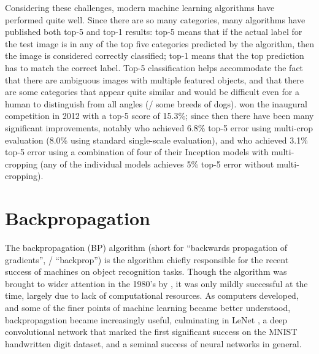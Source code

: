 Considering these challenges,
modern machine learning algorithms have performed quite well.
Since there are so many categories, many algorithms have published
both top-5 and top-1 results:
top-5 means that if the actual label for the test image
is in any of the top five categories predicted by the algorithm,
then the image is considered correctly classified;
top-1 means that the top prediction has to match the correct label.
Top-5 classification helps accommodate the fact that there are ambiguous images
with multiple featured objects,
and that there are some categories that appear quite similar
and would be difficult even for a human to distinguish from all angles
(\eg/ some breeds of dogs).
\textcite{Krizhevsky2012} won the inaugural competition in 2012
with a top-5 score of 15.3\%;
since then there have been many significant improvements,
notably \textcite{Simonyan2015} who achieved 6.8\% top-5 error
using multi-crop evaluation (8.0\% using standard single-scale evaluation),
and \textcite{Szegedy2016} who achieved 3.1\% top-5 error
using a combination of four of their Inception models with multi-cropping
(any of the individual models achieves 5\% top-5 error without multi-cropping).


\section{Backpropagation}

The backpropagation (BP) algorithm
(short for ``backwards propagation of gradients'', \aka/ ``backprop'')
is the algorithm chiefly responsible for the recent success of machines
on object recognition tasks.
Though the algorithm was
brought to wider attention in the 1980's by \textcite{Rumelhart1985},
it was only mildly successful at the time,
largely due to lack of computational resources.
As computers developed,
and some of the finer points of machine learning became better understood,
backpropagation became increasingly useful,
culminating in LeNet \parencite{Lecun1998},
a deep convolutional network that marked the first significant success
on the MNIST handwritten digit dataset,
and a seminal success of neural networks in general.

